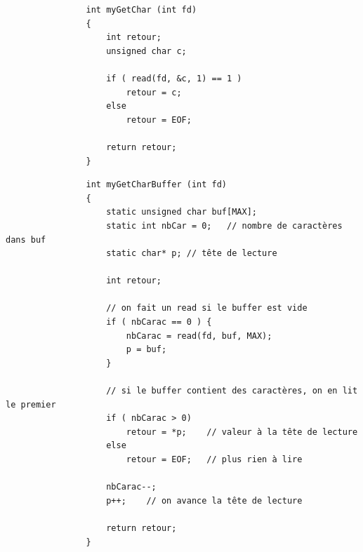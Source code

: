 		\begin{frame}[containsverbatim]
			\begin{lstlisting}
				int myGetChar (int fd) 
				{
					int retour;
					unsigned char c;
					
					if ( read(fd, &c, 1) == 1 )
						retour = c;
					else
						retour = EOF;
						
					return retour;
				}
			\end{lstlisting}
		\end{frame}	
		
		\begin{frame}[containsverbatim]
			\begin{lstlisting}
				int myGetCharBuffer (int fd) 
				{
					static unsigned char buf[MAX];
					static int nbCar = 0;	// nombre de caractères dans buf
					static char* p;	// tête de lecture
					
					int retour; 
					
					// on fait un read si le buffer est vide
					if ( nbCarac == 0 ) {
						nbCarac = read(fd, buf, MAX);
						p = buf;
					}
					
					// si le buffer contient des caractères, on en lit le premier
					if ( nbCarac > 0)
						retour = *p;	// valeur à la tête de lecture
					else 
						retour = EOF;	// plus rien à lire
						
					nbCarac--;
					p++;	// on avance la tête de lecture
						
					return retour;
				}
			\end{lstlisting}
		\end{frame}	
		
